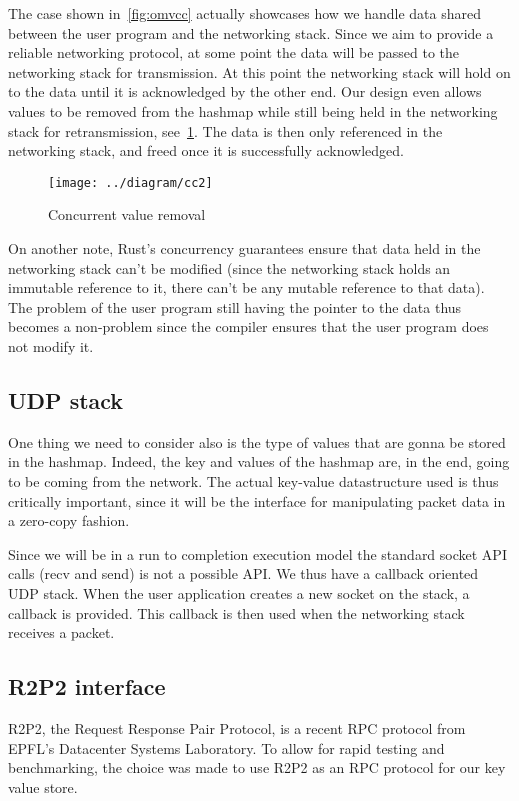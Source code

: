 \documentclass[11pt]{article}
\begin{document}
The case shown in~\ref{fig:omvcc} actually showcases how we handle
data shared between the user program and the networking stack. Since
we aim to provide a reliable networking protocol, at some point the
data will be passed to the networking stack for transmission. At this
point the networking stack will hold on to the data until it is
acknowledged by the other end. Our design even allows values to be
removed from the hashmap while still being held in the networking
stack for retransmission, see~\ref{fig:cc2}. The data is then only
referenced in the networking stack, and freed once it is successfully
acknowledged.

\begin{figure}[htb!]
  \texttt{[image: ../diagram/cc2]}
  \caption{Concurrent value removal}
  \label{fig:cc2}
\end{figure}

On another note, Rust's concurrency guarantees ensure that data held
in the networking stack can't be modified (since the networking stack
holds an immutable reference to it, there can't be any mutable
reference to that data). The problem of the user program still having
the pointer to the data thus becomes a non-problem since the compiler
ensures that the user program does not modify it.

\subsection{UDP stack}

One thing we need to consider also is the type of values that are
gonna be stored in the hashmap. Indeed, the key and values of the
hashmap are, in the end, going to be coming from the network. The
actual key-value datastructure used is thus critically important,
since it will be the interface for manipulating packet data in a
zero-copy fashion.

Since we will be in a run to completion execution model the standard
socket API calls (recv and send) is not a possible API\@. We thus have
a callback oriented UDP stack. When the user application creates a
new socket on the stack, a callback is provided. This callback is then
used when the networking stack receives a packet.

\subsection{R2P2 interface}

R2P2, the Request Response Pair Protocol, is a recent RPC protocol
from EPFL's Datacenter Systems Laboratory. To allow for rapid testing
and benchmarking, the choice was made to use R2P2 as an RPC protocol
for our key value store.
\end{document}
